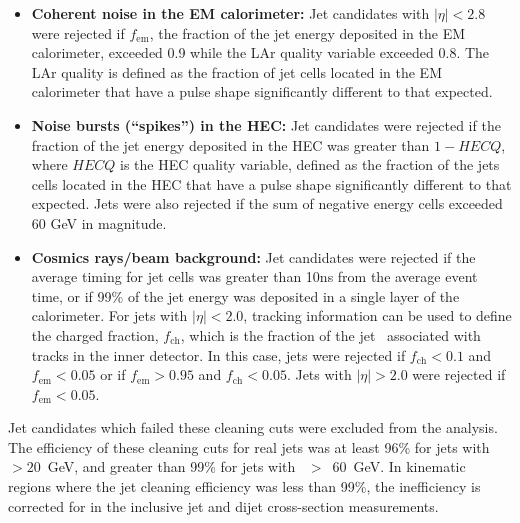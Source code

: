 \begin{itemize}
\item{\bf Coherent noise in the EM calorimeter:} Jet candidates with $|\eta| < 2.8$ were rejected if  $f_\mathrm{em}$, the fraction of the jet energy deposited in the EM calorimeter, exceeded 0.9 while the LAr quality variable exceeded 0.8. The LAr quality is defined as the fraction of jet cells located in the EM calorimeter that have a pulse shape significantly different to that expected.
\item{\bf Noise bursts (``spikes'') in the HEC:} Jet candidates were rejected if the fraction of the jet energy deposited in the HEC was greater than $1 - HECQ$, where $HECQ$ is the HEC quality variable, defined as the fraction of the jets cells located in the HEC that have a pulse shape significantly different to that expected. Jets were also rejected if the sum of negative energy cells exceeded 60 GeV in magnitude.
\item{\bf Cosmics rays/beam background:} Jet candidates were rejected if the average timing for jet cells was greater than 10ns from the average event time, or if 99\% of the jet energy was deposited in a single layer of the calorimeter. For jets with $|\eta| < 2.0$, tracking information can be used to define the charged fraction, $f_\mathrm{ch}$, which is the fraction of the jet \pt~associated with tracks in the inner detector. In this case, jets were rejected if $f_\mathrm{ch} < 0.1$ and $f_\mathrm{em} < 0.05$ or if $f_\mathrm{em} > 0.95$ and $f_\mathrm{ch} < 0.05$. Jets with $|\eta| > 2.0$ were rejected if $f_\mathrm{em} < 0.05$.
\end{itemize}

Jet candidates which failed these cleaning cuts were excluded from the analysis. The efficiency of these cleaning cuts for real jets was at least 96\% for jets with \pt~$> 20$~GeV, and greater than 99\% for jets with \pt~$>$~60~GeV. In kinematic regions where the jet cleaning efficiency was less than 99\%, the inefficiency is corrected for in the inclusive jet and dijet cross-section measurements.

